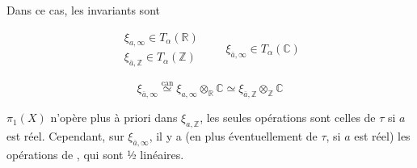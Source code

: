 \documentclass[11pt,a4paper]{article}
\begin{document}
Dans ce cas, les invariants sont

\[
  \begin{array}{l}
    \xi_{a,\infty} \in T_\alpha(\mathbb{R}) \\
    \xi_{\bar{a},\mathbb{Z}} \in T_\alpha(\mathbb{Z})
  \end{array}
  \qquad
  \xi_{\bar{a},\infty} \in T_\alpha(\mathbb{C})
\]

\[
  \xi_{\bar{a},\infty} \overset{\mathrm{can}}{\simeq} \xi_{a,\infty}
  \otimes_{\mathbb{R}} \mathbb{C} \simeq \xi_{\bar{a},\mathbb{Z}}
  \otimes_{\mathbb{Z}} \mathbb{C}
\]

$\pi_1(X)$ n'opère plus à priori dans $\xi_{a,\mathbb{Z}}$, les seules
opérations sont celles de $\tau$ si $a$ est réel. Cependant, sur
$\xi_{\bar{a},\infty}$, il y a (en plus éventuellement de $\tau$, si $a$ est
réel) les opérations de , qui
sont ½ linéaires.
\end{document}

